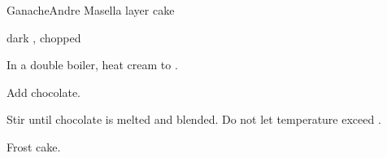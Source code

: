\begin{recipe}{Ganache}{Andre Masella}{ layer cake}

\begin{ingredients}
\item {} dark , chopped
\item {} 
\end{ingredients}

\begin{directions}
\item In a double boiler, heat cream to .
\item Add chocolate.
\item Stir until chocolate is melted and blended. Do not let temperature exceed .
\item Frost cake.
\end{directions}

\end{recipe}
